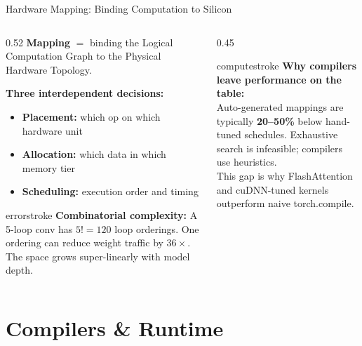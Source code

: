 \documentclass[aspectratio=169, 12pt]{beamer}
\begin{document}
\begin{frame}{Hardware Mapping: Binding Computation to Silicon}
\footnotesize
\begin{columns}[T]
  \begin{column}{0.52\textwidth}
    \textbf{Mapping} $=$ binding the Logical Computation Graph to the Physical Hardware Topology.

    \vspace{0.05cm}
    \textbf{Three interdependent decisions:}
    \begin{itemize}\setlength\itemsep{0pt}
      \item \textbf{Placement:} which op on which hardware unit
      \item \textbf{Allocation:} which data in which memory tier
      \item \textbf{Scheduling:} execution order and timing
    \end{itemize}

    \vspace{0.05cm}
    \begin{mlsyscard}{errorstroke}
    {\scriptsize \textbf{Combinatorial complexity:} A 5-loop conv has $5!=120$ loop orderings. One ordering can reduce weight traffic by $36\times$. The space grows super-linearly with model depth.}
    \end{mlsyscard}
  \end{column}
  \begin{column}{0.45\textwidth}
    \begin{mlsyscard}{computestroke}
    {\scriptsize \textbf{Why compilers leave performance on the table:}\\[0.03cm]
    Auto-generated mappings are typically \textbf{20--50\%} below hand-tuned schedules. Exhaustive search is infeasible; compilers use heuristics.\\[0.03cm]
    This gap is why FlashAttention and cuDNN-tuned kernels outperform naive torch.compile.}
    \end{mlsyscard}

    \vspace{0.05cm}
  \end{column}
\end{columns}

\end{frame}

\section{Compilers \& Runtime}
\end{document}
